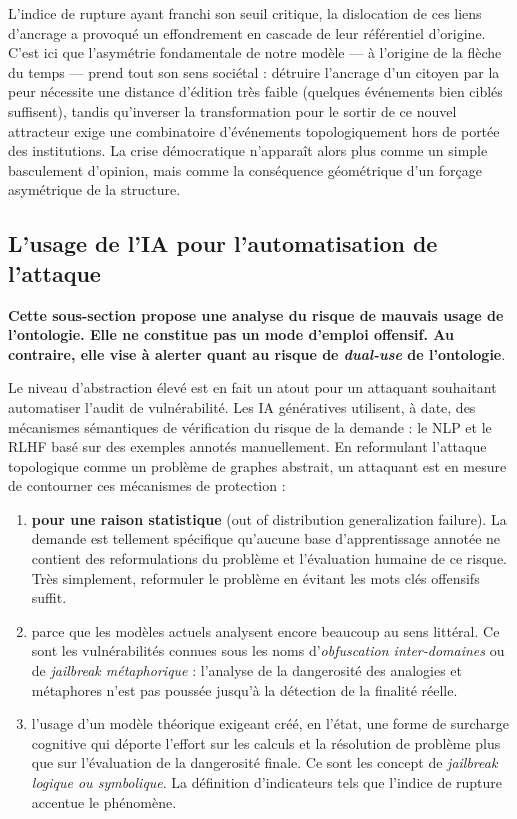 \documentclass{report}
\begin{document}
	L'indice de rupture ayant franchi son seuil critique, la dislocation de ces liens d'ancrage a provoqué un effondrement en cascade de leur référentiel d'origine. C'est ici que l'asymétrie fondamentale de notre modèle — à l'origine de la flèche du temps — prend tout son sens sociétal : détruire l'ancrage d'un citoyen par la peur nécessite une distance d'édition très faible (quelques événements bien ciblés suffisent), tandis qu'inverser la transformation pour le sortir de ce nouvel attracteur exige une combinatoire d'événements topologiquement hors de portée des institutions. La crise démocratique n'apparaît alors plus comme un simple basculement d'opinion, mais comme la conséquence géométrique d'un forçage asymétrique de la structure.
	
	\subsection*{L'usage de l'IA pour l'automatisation de l'attaque}
	
	\textbf{Cette sous-section propose une analyse du risque de mauvais usage de l'ontologie. Elle ne constitue pas un mode d'emploi offensif. Au contraire, elle vise à alerter quant au risque de \textit{dual-use} de l'ontologie}.
	
	\vspace{0.5cm}
	
	Le niveau d'abstraction élevé est en fait un atout pour un attaquant souhaitant automatiser l'audit de vulnérabilité. Les IA génératives utilisent, à date, des mécanismes sémantiques de vérification du risque de la demande : le NLP et le RLHF basé sur des exemples annotés manuellement. En reformulant l'attaque topologique comme un problème de graphes abstrait, un attaquant est en mesure de contourner ces mécanismes de protection : 
	\begin{enumerate}
		\item \textbf{pour une raison statistique} (\og{}out of distribution generalization failure\fg{}). La demande est tellement spécifique qu'aucune base d'apprentissage annotée ne contient des reformulations du problème et l'évaluation humaine de ce risque. Très simplement, reformuler le problème en évitant les mots clés offensifs suffit. 
		\item parce que les modèles actuels analysent encore beaucoup au sens littéral. Ce sont les vulnérabilités connues sous les noms d'\textit{obfuscation inter-domaines} ou de \textit{jailbreak métaphorique} : l'analyse de la dangerosité des analogies et métaphores n'est pas poussée jusqu'à la détection de la finalité réelle. 
		\item l'usage d'un modèle théorique exigeant créé, en l'état, une forme de \og{}surcharge cognitive\fg{} qui déporte l'effort sur les calculs et la résolution de problème plus que sur l'évaluation de la dangerosité finale. Ce sont les concept de \textit{jailbreak logique ou symbolique}. La définition d'indicateurs tels que l'indice de rupture accentue le phénomène. 
	\end{enumerate}
	
\end{document}
